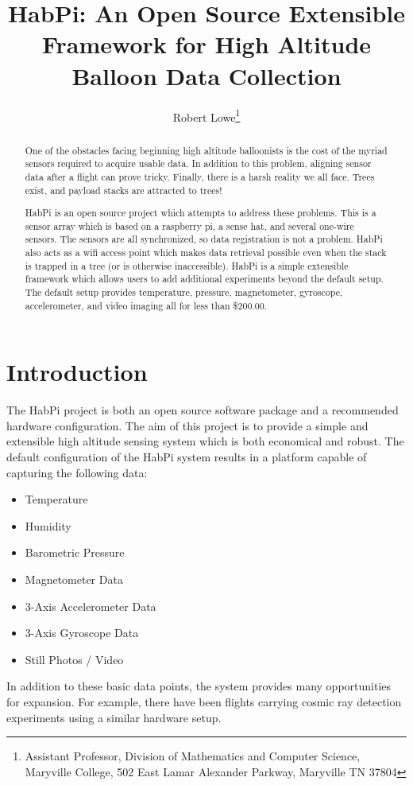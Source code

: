 \documentclass[journal]{new-aiaa}
\title{HabPi: An Open Source Extensible Framework for High Altitude
Balloon Data Collection}
\author{Robert Lowe\footnote{Assistant Professor, Division of
Mathematics and Computer Science, Maryville College, 502 East Lamar
Alexander Parkway, Maryville TN 37804}}
\affil{Maryville College}
\begin{document}
\maketitle

\begin{abstract}
One of the obstacles facing beginning high altitude balloonists
is the cost of the myriad sensors required to acquire usable data.
In addition to this problem, aligning sensor data after a flight can
prove tricky.  Finally, there is a harsh reality we all face.  Trees
exist, and payload stacks are attracted to trees!

HabPi is an open source project which attempts to address these
problems.  This is a sensor array which is based on a raspberry pi,
a sense hat, and several one-wire sensors.  The sensors are all
synchronized, so data registration is not a problem.  HabPi also acts
as a wifi access point which makes data retrieval possible even when
the stack is trapped in a tree (or is otherwise inaccessible).  HabPi
is a simple extensible framework which allows users to add additional
experiments beyond the default setup.  The default setup provides
temperature, pressure, magnetometer, gyroscope, accelerometer, and
video imaging all for less than \$200.00.
\end{abstract}

\section{Introduction}
The HabPi project is both an open source software package and
a recommended hardware configuration.  The aim of this project is to
provide a simple and extensible high altitude sensing system which is
both economical and robust. The default configuration of the HabPi
system results in a platform capable of capturing the following data:
\begin{itemize}
    \item Temperature
    \item Humidity
    \item Barometric Pressure
    \item Magnetometer Data
    \item 3-Axis Accelerometer Data
    \item 3-Axis Gyroscope Data
    \item Still Photos / Video
\end{itemize}
In addition to these basic data points, the system provides many
opportunities for expansion.  For example, there have been flights
carrying cosmic ray detection experiments using a similar hardware
setup.  
\end{document}
